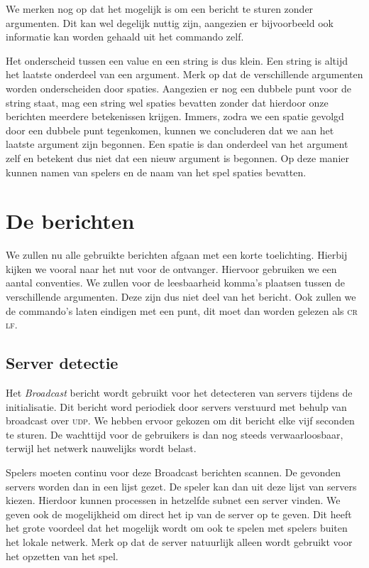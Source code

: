 \documentclass[a4paper,11pt]{article}
\newcommand{\udp}{\textsc{udp}\xspace}
\begin{document}
    We merken nog op dat het mogelijk is om een bericht te sturen zonder argumenten. Dit kan wel degelijk nuttig zijn, aangezien er bijvoorbeeld ook informatie kan worden gehaald uit het commando zelf.

    Het onderscheid tussen een value en een string is dus klein. Een string is altijd het laatste onderdeel van een argument. Merk op dat de verschillende argumenten worden onderscheiden door spaties. Aangezien er nog een dubbele punt voor de string staat, mag een string wel spaties bevatten zonder dat hierdoor onze berichten meerdere betekenissen krijgen. Immers, zodra we een spatie gevolgd door een dubbele punt tegenkomen, kunnen we concluderen dat we aan het laatste argument zijn begonnen. Een spatie is dan onderdeel van het argument zelf en betekent dus niet dat een nieuw argument is begonnen. Op deze manier kunnen namen van spelers en de naam van het spel spaties bevatten.

    \section{De berichten}
    We zullen nu alle gebruikte berichten afgaan met een korte toelichting. Hierbij kijken we vooral naar het nut voor de ontvanger. Hiervoor gebruiken we een aantal conventies. We zullen voor de leesbaarheid komma's plaatsen tussen de verschillende argumenten. Deze zijn dus niet deel van het bericht. Ook zullen we de commando's laten eindigen met een punt, dit moet dan worden gelezen als \textsc{cr lf}.

    \subsection{Server detectie}
    Het \emph{Broadcast} bericht wordt gebruikt voor het detecteren van servers tijdens de initialisatie. Dit bericht word periodiek door servers verstuurd met behulp van broadcast over \udp. We hebben ervoor gekozen om dit bericht elke vijf seconden te sturen. De wachttijd voor de gebruikers is dan nog steeds verwaarloosbaar, terwijl het netwerk nauwelijks wordt belast.

    Spelers moeten continu voor deze Broadcast berichten scannen. De gevonden servers worden dan in een lijst gezet. De speler kan dan uit deze lijst van servers kiezen. Hierdoor kunnen processen in hetzelfde subnet een server vinden. We geven ook de mogelijkheid om direct het ip van de server op te geven. Dit heeft het grote voordeel dat het mogelijk wordt om ook te spelen met spelers buiten het lokale netwerk. Merk op dat de server natuurlijk alleen wordt gebruikt voor het opzetten van het spel.
\end{document}
